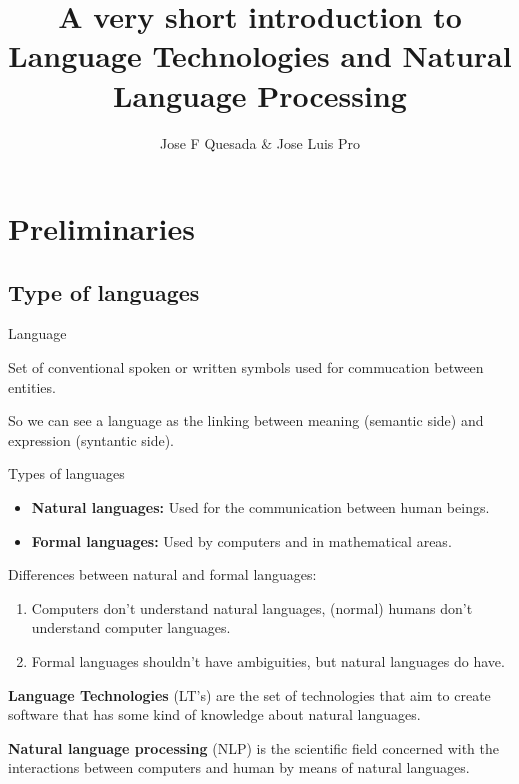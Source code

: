 \documentclass[11pt]{beamer}
\title[Language technologies and natural language processing]{A very short introduction to Language Technologies and Natural Language Processing}
\author{Jose F Quesada \& Jose Luis Pro}
\date{}
\begin{document}
\begin{frame}
\titlepage
\end{frame}

\section{Preliminaries}
\subsection{Type of languages}

\begin{frame}
	\begin{block}{Language}
		\begin{center}
			Set of conventional spoken or written symbols used for commucation between entities.\par
			\pause
			So we can see a language as the linking between meaning (semantic side) and expression (syntantic side).
		\end{center}
	\end{block}
	\pause
	\vspace{15pt}
	Types of languages
	\begin{itemize}
		\item \textbf{Natural languages:} Used for the communication between human beings.
		\item \textbf{Formal languages:} Used by computers and in mathematical areas.
	\end{itemize}
\end{frame}

\begin{frame}
	\begin{block}{Differences between natural and formal languages:}
		\begin{enumerate}
			\pause
			\item Computers don't understand natural languages, (normal) humans don't understand computer languages.
			\item Formal languages shouldn't have ambiguities, but natural languages do have.
		\end{enumerate}
	\end{block} 
	\vspace{10pt}
	\pause 
	\textbf{Language Technologies} (LT's) are the set of technologies that aim to create software that has some kind of knowledge about natural languages. \par
	\vspace{10pt}
	\pause
	\textbf{Natural language processing} (NLP) is the scientific field concerned with the interactions between computers and human by means of natural languages.
\end{frame}
\end{document}
